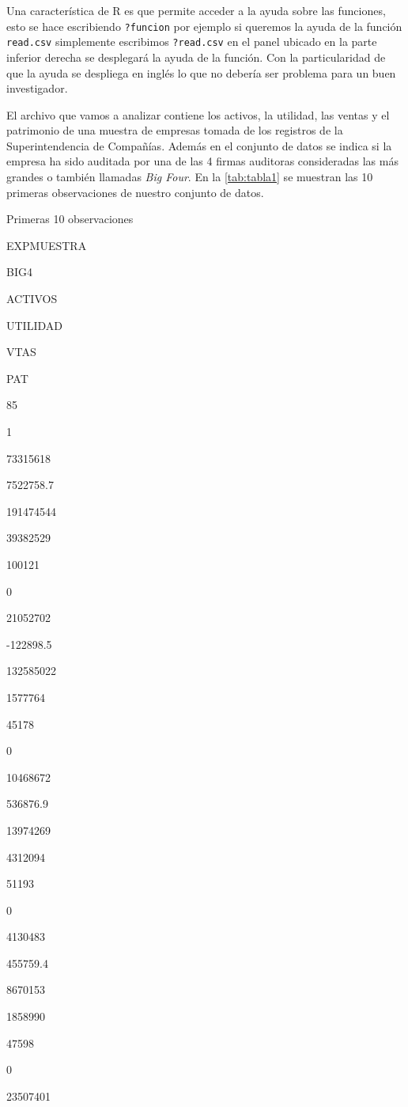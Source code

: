 \documentclass[]{book}
\begin{document}
Una característica de R es que permite acceder a la ayuda sobre las
funciones, esto se hace escribiendo \texttt{?funcion} por ejemplo si
queremos la ayuda de la función \texttt{read.csv} simplemente escribimos
\texttt{?read.csv} en el panel ubicado en la parte inferior derecha se
desplegará la ayuda de la función. Con la particularidad de que la ayuda
se despliega en inglés lo que no debería ser problema para un buen
investigador.

El archivo que vamos a analizar contiene los activos, la utilidad, las
ventas y el patrimonio de una muestra de empresas tomada de los
registros de la Superintendencia de Compañías. Además en el conjunto de
datos se indica si la empresa ha sido auditada por una de las 4 firmas
auditoras consideradas las más grandes o también llamadas
\emph{\emph{Big Four}}. En la \ref{tab:tabla1} se muestran las 10
primeras observaciones de nuestro conjunto de datos.

\label{tab:tabla1}Primeras 10 observaciones

EXPMUESTRA

BIG4

ACTIVOS

UTILIDAD

VTAS

PAT

85

1

73315618

7522758.7

191474544

39382529

100121

0

21052702

-122898.5

132585022

1577764

45178

0

10468672

536876.9

13974269

4312094

51193

0

4130483

455759.4

8670153

1858990

47598

0

23507401
\end{document}
